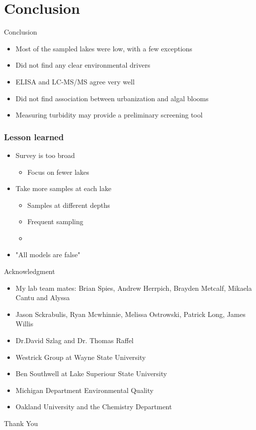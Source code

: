 \section{Conclusion}
\begin{frame}{Conclusion}
	\begin{itemize}
		\item Most of the sampled lakes were low, with a few exceptions 
		\item Did not find any clear environmental drivers 
		\item ELISA and LC-MS/MS agree very well 
		\item Did not find association between urbanization and algal blooms 
		\item Measuring turbidity may provide a preliminary screening tool
	\end{itemize}

	
\end{frame}
\begin{frame}
	\frametitle{Lesson learned}

	\begin{itemize}
		\item Survey is too broad 
			\begin{itemize}
				\item Focus on fewer lakes
			\end{itemize}
		\item Take more samples at each lake 
			\begin{itemize}
				\item Samples at different depths 
				\item Frequent sampling 
				\item 
			\end{itemize}
		\item "All models are false"
	\end{itemize}

	

\end{frame}


\begin{frame}{Acknowledgment}

	\begin{itemize} 
		\item My lab team mates: Brian Spies, Andrew Herrpich, Brayden Metcalf, Mikaela Cantu and Alyssa
		\item Jason Sckrabulis, Ryan Mcwhinnie, Melissa Ostrowski, Patrick Long, James Willis
		\item Dr.David Szlag and Dr. Thomas Raffel
		\item Westrick Group at Wayne State University
		\item Ben Southwell at Lake Superiour State University
		\item Michigan Department Environmental Quality
		\item Oakland University and the Chemistry Department
	\end{itemize}
\end{frame}
\begin{frame}
\begin{center}
Thank You
\end{center}
\end{frame}
